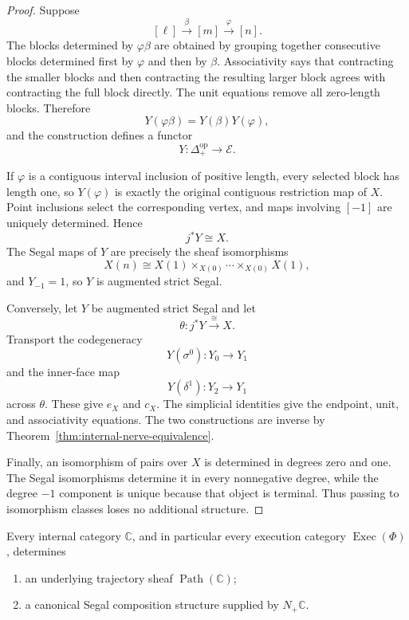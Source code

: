 \begin{proof}
Suppose
\[
    [\ell]\xrightarrow{\beta}[m]
    \xrightarrow{\varphi}[n].
\]
The blocks determined by \(\varphi\beta\) are obtained by grouping together
consecutive blocks determined first by \(\varphi\) and then by \(\beta\).
Associativity says that contracting the smaller blocks and then contracting
the resulting larger block agrees with contracting the full block directly.
The unit equations remove all zero-length blocks. Therefore
\[
    Y(\varphi\beta)
    =
    Y(\beta)Y(\varphi),
\]
and the construction defines a functor
\[
    Y:\Delta_+^{\mathrm{op}}\to\mathcal E.
\]

If \(\varphi\) is a contiguous interval inclusion of positive length, every
selected block has length one, so \(Y(\varphi)\) is exactly the original
contiguous restriction map of \(X\). Point inclusions select the corresponding
vertex, and maps involving \([-1]\) are uniquely determined. Hence
\[
    j^\ast Y\cong X.
\]
The Segal maps of \(Y\) are precisely the sheaf isomorphisms
\[
    X(n)
    \cong
    X(1)\times_{X(0)}\cdots\times_{X(0)}X(1),
\]
and \(Y_{-1}=1\), so \(Y\) is augmented strict Segal.

Conversely, let \(Y\) be augmented strict Segal and let
\[
    \theta:j^\ast Y\xrightarrow{\cong}X.
\]
Transport the codegeneracy
\[
    Y(\sigma^0):Y_0\to Y_1
\]
and the inner-face map
\[
    Y(\delta^1):Y_2\to Y_1
\]
across \(\theta\). These give \(e_X\) and \(c_X\). The simplicial identities
give the endpoint, unit, and associativity equations. The two constructions
are inverse by Theorem~\ref{thm:internal-nerve-equivalence}.

Finally, an isomorphism of pairs over \(X\) is determined in degrees zero and
one. The Segal isomorphisms determine it in every nonnegative degree, while
the degree \(-1\) component is unique because that object is terminal. Thus
passing to isomorphism classes loses no additional structure.
\end{proof}

\begin{corollary}
\label{cor:segal-enhancement-internal-category}
Every internal category \(\mathbb C\), and in particular every execution
category \(\operatorname{Exec}(\Phi)\), determines
\begin{enumerate}
    \item an underlying trajectory sheaf \(\operatorname{Path}(\mathbb C)\);
    \item a canonical Segal composition structure supplied by
    \(N_+\mathbb C\).
\end{enumerate}
\end{corollary}

